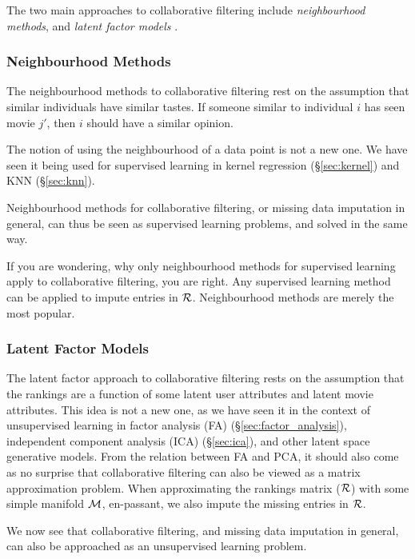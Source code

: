 The two main approaches to collaborative filtering include \emph{neighbourhood methods}, and \emph{latent factor models} \cite{koren_matrix_2009}.

\subsubsection{Neighbourhood Methods}
The neighbourhood methods to collaborative filtering rest on the assumption that similar individuals have similar tastes. 
If someone similar to individual $i$ has seen movie $j'$, then $i$ should have a similar opinion.

The notion of using the neighbourhood of a data point is not a new one. We have seen it being used for supervised learning in kernel regression (\S\ref{sec:kernel}) and KNN (\S\ref{sec:knn}).

Neighbourhood methods for collaborative filtering, or missing data imputation in general, can thus be seen as supervised learning problems, and solved in the same way.


\begin{remark}
If you are wondering, why only neighbourhood methods for supervised learning apply to collaborative filtering, you are right.
Any supervised learning method can be applied to impute entries in $\mathcal{R}$. Neighbourhood 
methods are merely the most popular.
\end{remark}


\subsubsection{Latent Factor Models}
The latent factor approach to collaborative filtering rests on the assumption that the rankings are a function of some latent user attributes and latent movie attributes. 
This idea is not a new one, as we have seen it in the context of unsupervised learning in factor analysis (FA) (\S\ref{sec:factor_analysis}), independent component analysis (ICA) (\S\ref{sec:ica}), and other latent space generative models.
From the relation between FA and PCA, it should also come as no surprise that collaborative filtering can also be viewed as a matrix approximation problem. 
When approximating the rankings matrix ($\mathcal{R}$) with some simple manifold $\mathcal{M}$, en-passant, we also impute the missing entries in $\mathcal{R}$.

We now see that collaborative filtering, and missing data imputation in general, can also be approached as an unsupervised learning problem. 



